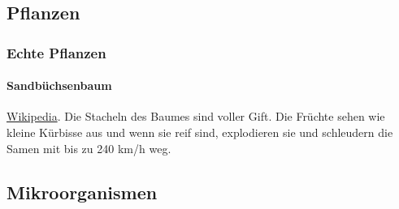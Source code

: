\subsection{Pflanzen}
\subsubsection{Echte Pflanzen}
\paragraph{Sandbüchsenbaum} \href{https://de.wikipedia.org/wiki/Sandb\%C3\%BCchsenbaum}{Wikipedia}. Die Stacheln des Baumes sind voller Gift. Die Früchte sehen wie kleine Kürbisse aus und wenn sie reif sind, explodieren sie und schleudern die Samen mit bis zu 240 km/h weg.

\subsection{Mikroorganismen}